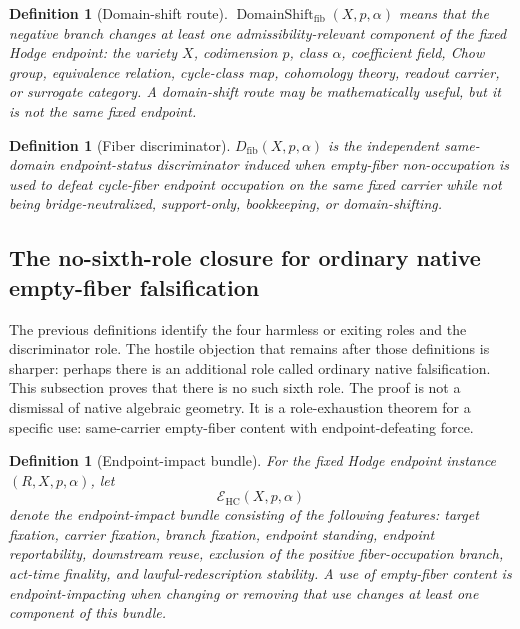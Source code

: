 \documentclass[11pt]{article}
\newtheorem{definition}[theorem]{Definition}
\newcommand{\HC}{\operatorname{HC}}
\begin{document}
\begin{definition}[Domain-shift route]
$\operatorname{DomainShift}_{\mathrm{fib}}(X,p,\alpha)$ means that the negative branch changes at least one admissibility-relevant component of the fixed Hodge endpoint: the variety $X$, codimension $p$, class $\alpha$, coefficient field, Chow group, equivalence relation, cycle-class map, cohomology theory, readout carrier, or surrogate category.  A domain-shift route may be mathematically useful, but it is not the same fixed endpoint.
\end{definition}

\begin{definition}[Fiber discriminator]
$D_{\mathrm{fib}}(X,p,\alpha)$ is the independent same-domain endpoint-status discriminator induced when empty-fiber non-occupation is used to defeat cycle-fiber endpoint occupation on the same fixed carrier while not being bridge-neutralized, support-only, bookkeeping, or domain-shifting.
\end{definition}


\subsection{The no-sixth-role closure for ordinary native empty-fiber falsification}

The previous definitions identify the four harmless or exiting roles and the discriminator role. The hostile objection that remains after those definitions is sharper: perhaps there is an additional role called ordinary native falsification. This subsection proves that there is no such sixth role. The proof is not a dismissal of native algebraic geometry. It is a role-exhaustion theorem for a specific use: same-carrier empty-fiber content with endpoint-defeating force.

\begin{definition}[Endpoint-impact bundle]
For the fixed Hodge endpoint instance $(R,X,p,\alpha)$, let
\[
\mathcal E_{\HC}(X,p,\alpha)
\]
denote the endpoint-impact bundle consisting of the following features: target fixation, carrier fixation, branch fixation, endpoint standing, endpoint reportability, downstream reuse, exclusion of the positive fiber-occupation branch, act-time finality, and lawful-redescription stability. A use of empty-fiber content is endpoint-impacting when changing or removing that use changes at least one component of this bundle.
\end{definition}
\end{document}

